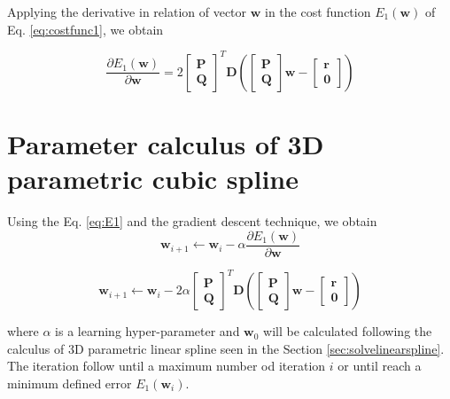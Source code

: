 Applying the derivative in relation of vector $\mathbf{w}$
\cite[pp. 11]{petersen2008matrix}
in the cost function $E_{1}(\mathbf{w})$ of Eq. \ref{eq:costfunc1}, 
we obtain

\begin{equation}\label{eq:E1}
\frac{\partial E_{1}(\mathbf{w})}{\partial \mathbf{w}}
=
2
\begin{bmatrix}
\mathbf{P}\\
\mathbf{Q}
\end{bmatrix}^{T}
\mathbf{D}
\left(
\begin{bmatrix}
\mathbf{P}\\
\mathbf{Q}
\end{bmatrix}
\mathbf{w}
-
\begin{bmatrix}
\mathbf{r}\\
\mathbf{0}
\end{bmatrix}
\right)
\end{equation}

\section{Parameter calculus of 3D parametric cubic spline}
\label{sec:solvecubicspline}
Using the Eq. \ref{eq:E1} and the gradient descent technique, we obtain
\begin{equation}
\mathbf{w}_{i+1}
\leftarrow 
\mathbf{w}_{i}
-
\alpha
\frac{\partial E_{1}(\mathbf{w})}{\partial \mathbf{w}}
\end{equation}

\begin{equation}
\mathbf{w}_{i+1}
\leftarrow 
\mathbf{w}_{i}
-
2
\alpha
\begin{bmatrix}
\mathbf{P}\\
\mathbf{Q}
\end{bmatrix}^{T}
\mathbf{D}
\left(
\begin{bmatrix}
\mathbf{P}\\
\mathbf{Q}
\end{bmatrix}
\mathbf{w}
-
\begin{bmatrix}
\mathbf{r}\\
\mathbf{0}
\end{bmatrix}
\right)
\end{equation}

where $\alpha$ is a learning hyper-parameter and 
$\mathbf{w}_{0}$ 
will be calculated following the calculus of 3D parametric linear spline
seen in the Section \ref{sec:solvelinearspline}.
The iteration follow until a maximum number od iteration $i$ or until reach a
minimum defined error $E_1(\mathbf{w}_{i})$. 

